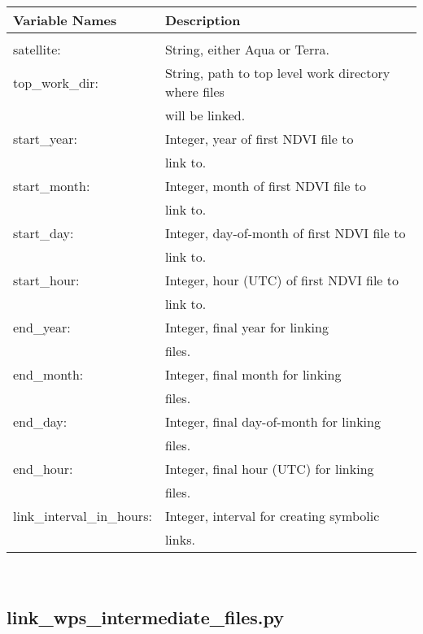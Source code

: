 \documentclass{article}
\begin{document}
\begin{tabular}{|l|l|} \hline
Variable Names          & Description \\ \hline
[LINK\_GIMMS]           & \\ \hline
satellite:      & String, either Aqua or Terra. \\ \hline
top\_work\_dir: & String, path to top level work directory where files \\
                & will be linked. \\ \hline
start\_year:            & Integer, year of first NDVI file to \\
                        & link to. \\ \hline
start\_month:           & Integer, month of first NDVI file to \\
                        & link to. \\ \hline
start\_day:             & Integer, day-of-month of first NDVI file to \\
                        & link to. \\ \hline
start\_hour:            & Integer, hour (UTC) of first NDVI file to \\
                        & link to. \\ \hline
end\_year:              & Integer, final year for linking \\ 
                        & files. \\ \hline
end\_month:             & Integer, final month for linking \\
                        & files. \\ \hline
end\_day:               & Integer, final day-of-month for linking \\
                        & files. \\ \hline
end\_hour:              & Integer, final hour (UTC) for linking \\
                        & files. \\ \hline
link\_interval\_in\_hours: & Integer, interval for creating symbolic \\
                        & links. \\ \hline
\end{tabular} \\

\subsection{link\_wps\_intermediate\_files.py}
\label{subsec:linkWpsIntermediateFilesPy}
\end{document}
